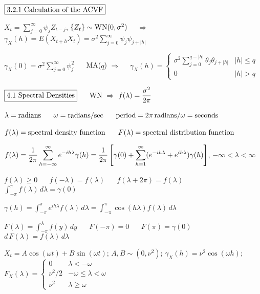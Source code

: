 \documentclass[12pt]{article}
\begin{document}
\newpage



$\boxed{\hbox{3.2.1 Calculation of the ACVF}}$


$\displaystyle
X_t=\sum_{j=0}^\infty \psi_jZ_{t-j}$, $\{Z_t\}\sim{\rm WN}(0,\sigma^2)$
$\quad\Rightarrow\quad$
$\displaystyle\gamma_X(h)=E(X_{t+h}X_t)=\sigma^2\sum_{j=0}^\infty\psi_j\psi_{j+|h|}$

$\displaystyle\gamma_X(0)=\sigma^2\sum_{j=0}^\infty\psi_j^2$
$\quad$
MA($q$)
$\Rightarrow\quad$
$\displaystyle
\gamma_X(h)=\left\{\begin{array}{ll}
\displaystyle\sigma^2\sum_{j=0}^{q-|h|}\theta_j\theta_{j+|h|} & |h|\le q\\
0 & |h|>q
\end{array}\right.
$



$\boxed{\hbox{4.1 Spectral Densities}}$
$\quad$
WN
$\Rightarrow$
$\displaystyle
f(\lambda)={\sigma^2\over2\pi}$


$\lambda=\hbox{radians}$
$\quad$
$\omega=\hbox{radians/sec}$
$\quad$
$\hbox{period}=2\pi\,\hbox{radians}/\omega=\hbox{seconds}$

$f(\lambda)=\hbox{spectral density function}$
$\quad$
$F(\lambda)=\hbox{spectral distribution function}$

$\displaystyle
f(\lambda)={1\over2\pi}\sum_{h=-\infty}^\infty
e^{-ih\lambda}\gamma(h)
={1\over2\pi}\left[
\gamma(0)+\sum_{h=1}^\infty(e^{-ih\lambda}+e^{ih\lambda})\gamma(h)\right]
$, $-\infty<\lambda<\infty$

$f(\lambda)\ge0$
$\quad$
$f(-\lambda)=f(\lambda)$
$\quad$
$f(\lambda+2\pi)=f(\lambda)$
$\quad$
$\displaystyle\int_{-\pi}^\pi f(\lambda)\,d\lambda=\gamma(0)$

$\displaystyle
\gamma(h)=\int_{-\pi}^\pi e^{ih\lambda}f(\lambda)\,d\lambda
=\int_{-\pi}^\pi\cos(h\lambda)f(\lambda)\,d\lambda$

$\displaystyle
F(\lambda)=\int_{-\pi}^\lambda f(y)\,dy$
$\quad$
$F(-\pi)=0$
$\quad$
$F(\pi)=\gamma(0)$
$\quad$
$d\,F(\lambda)=f(\lambda)\,d\lambda$


$X_t=A\cos(\omega t)+B\sin(\omega t)$;\;
$A,B\sim(0,\nu^2)$;\;
$\gamma_X(h)=\nu^2\cos(\omega h)$;\;
$\displaystyle
F_X(\lambda)=\left\{\begin{array}{ll}
0 & \lambda<-\omega\\
\nu^2/2 & -\omega\le\lambda<\omega\\
\nu^2 & \lambda\ge\omega
\end{array}\right.
$
\end{document}
